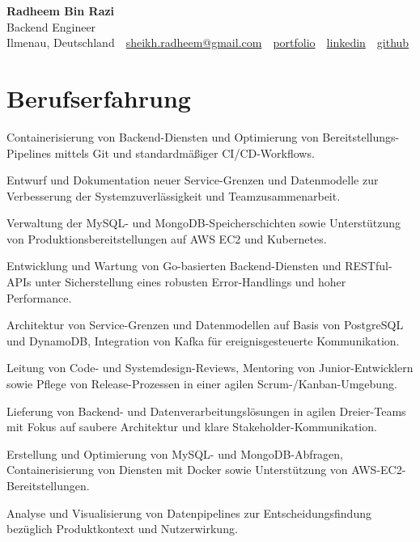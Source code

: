 \documentclass[11pt,a4paper]{resume}
\makeatletter
\newcommand{\Portfolio}{https://radheem.github.io/my-cv}
\newcommand{\PortfolioText}{portfolio}
\newcommand{\GitHub}{https://github.com/radheem}
\newcommand{\LinkedIn}{https://www.linkedin.com/in/radheem-razi}
\newcommand{\Email}{sheikh.radheem@gmail.com}
\makeatother
\begin{document}
\clearpage
{}

\begin{center}
  {\huge\bfseries Radheem Bin Razi}\\[3pt]
  {\large Backend Engineer}\\[6pt]
  \small
  Ilmenau, Deutschland \,\textbar\,
  \href{mailto:\Email}{\Email} \,\textbar\,
  \href{\Portfolio}{\PortfolioText} \,\textbar\,
  \href{\LinkedIn}{linkedin} \,\textbar\,
  \href{\GitHub}{github}
\end{center}
\vspace{2pt}

\section{Berufserfahrung}

\bullets
  \item Containerisierung von Backend-Diensten und Optimierung von Bereitstellungs-Pipelines mittels Git und standardmäßiger CI/CD-Workflows.
  \item Entwurf und Dokumentation neuer Service-Grenzen und Datenmodelle zur Verbesserung der Systemzuverlässigkeit und Teamzusammenarbeit.
  \item Verwaltung der MySQL- und MongoDB-Speicherschichten sowie Unterstützung von Produktionsbereitstellungen auf AWS EC2 und Kubernetes.
\bulletsend
\vspace{3pt}
\bullets
  \item Entwicklung und Wartung von Go-basierten Backend-Diensten und RESTful-APIs unter Sicherstellung eines robusten Error-Handlings und hoher Performance.
  \item Architektur von Service-Grenzen und Datenmodellen auf Basis von PostgreSQL und DynamoDB, Integration von Kafka für ereignisgesteuerte Kommunikation.
  \item Leitung von Code- und Systemdesign-Reviews, Mentoring von Junior-Entwicklern sowie Pflege von Release-Prozessen in einer agilen Scrum-/Kanban-Umgebung.
\bulletsend
\vspace{3pt}
\bullets
  \item Lieferung von Backend- und Datenverarbeitungslösungen in agilen Dreier-Teams mit Fokus auf saubere Architektur und klare Stakeholder-Kommunikation.
  \item Erstellung und Optimierung von MySQL- und MongoDB-Abfragen, Containerisierung von Diensten mit Docker sowie Unterstützung von AWS-EC2-Bereitstellungen.
  \item Analyse und Visualisierung von Datenpipelines zur Entscheidungsfindung bezüglich Produktkontext und Nutzerwirkung.
\bulletsend
\vspace{3pt}
\end{document}
